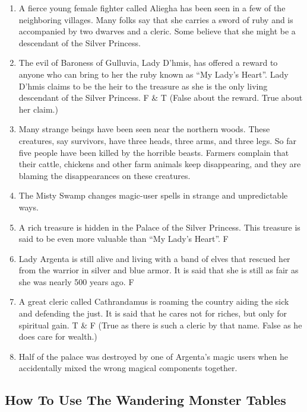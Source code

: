 \documentclass[palace_of_the_silver_princess]{subfiles}
\begin{document}
\begin{enumerate}
	\item A fierce young female fighter called Aliegha has been seen in
		a few of the neighboring villages. Many folks say that she
		carries a sword of ruby and is accompanied by two dwarves and a
		cleric. Some believe that she might be a descendant of the
		Silver Princess.

	\item The evil of Baroness of Gulluvia, Lady D’hmis, has offered a
		reward to anyone who can bring to her the ruby known as “My
		Lady’s Heart”. Lady D’hmis claims to be the heir to the treasure
		as she is the only living descendant of the Silver
		Princess. F \& T (False about the reward. True about her claim.)

	\item Many strange beings have been seen near the northern woods.
		These creatures, say survivors, have three heads, three arms,
		and three legs. So far five people have been killed by the
		horrible beasts. Farmers complain that their cattle, chickens
		and other farm animals keep disappearing, and they are blaming
		the disappearances on these creatures.

	\item The Misty Swamp changes magic-user spells in strange and
		unpredictable ways.

	\item A rich treasure is hidden in the Palace of the Silver
		Princess. This treasure is said to be even more valuable than
		“My Lady’s Heart”. F

	\item Lady Argenta is still alive and living with a band of elves
		that rescued her from the warrior in silver and blue armor. It
		is said that she is still as fair as she was nearly 500 years
		ago. F

	\item A great cleric called Cathrandamus is roaming the country
		aiding the sick and defending the just. It is said that he cares
		not for riches, but only for spiritual gain. T \& F (True as
		there is such a cleric by that name. False as he does care for
		wealth.)

	\item Half of the palace was destroyed by one of Argenta’s magic
		users when he accidentally mixed the wrong magical components
		together.
\end{enumerate}

\subsection{How To Use The Wandering Monster Tables}
\end{document}
